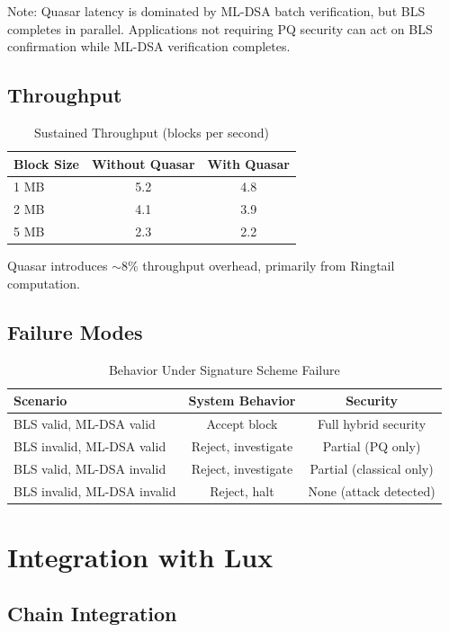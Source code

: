 \documentclass[11pt,a4paper]{article}
\begin{document}
Note: Quasar latency is dominated by ML-DSA batch verification, but BLS completes in parallel. Applications not requiring PQ security can act on BLS confirmation while ML-DSA verification completes.

\subsection{Throughput}

\begin{table}[h]
\centering
\caption{Sustained Throughput (blocks per second)}
\begin{tabular}{@{}lcc@{}}
\toprule
Block Size & Without Quasar & With Quasar \\
\midrule
1 MB & 5.2 & 4.8 \\
2 MB & 4.1 & 3.9 \\
5 MB & 2.3 & 2.2 \\
\bottomrule
\end{tabular}
\end{table}

Quasar introduces $\sim$8\% throughput overhead, primarily from Ringtail computation.

\subsection{Failure Modes}

\begin{table}[h]
\centering
\caption{Behavior Under Signature Scheme Failure}
\begin{tabular}{@{}lcc@{}}
\toprule
Scenario & System Behavior & Security \\
\midrule
BLS valid, ML-DSA valid & Accept block & Full hybrid security \\
BLS invalid, ML-DSA valid & Reject, investigate & Partial (PQ only) \\
BLS valid, ML-DSA invalid & Reject, investigate & Partial (classical only) \\
BLS invalid, ML-DSA invalid & Reject, halt & None (attack detected) \\
\bottomrule
\end{tabular}
\end{table}

\section{Integration with Lux}

\subsection{Chain Integration}
\end{document}
